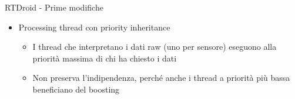 \begin{frame}{RTDroid - Prime modifiche}
{\begin{itemize}
\begin{itemize}
			\begin{itemize}
				\item Così i dati raw vengono raccolti nei momenti giusti, senza rischiare che un ritardo nel raccoglimento causi errori nelle risposte
			\end{itemize}
			\item Processing thread con priority inheritance
			\begin{itemize}
				\item I thread che interpretano i dati raw (uno per sensore) eseguono alla priorità massima di chi ha chiesto i dati
				\item Non preserva l'indipendenza, perché anche i thread a priorità più bassa beneficiano del boosting
			\end{itemize}
		\end{itemize}
	\end{itemize}}
\end{frame}